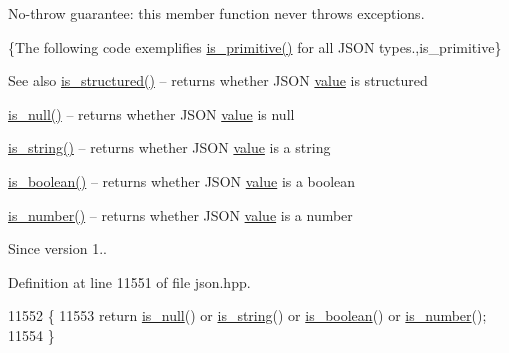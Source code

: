 No-\/throw guarantee\+: this member function never throws exceptions.

\{The following code exemplifies {\ttfamily \hyperlink{classnlohmann_1_1basic__json_a6362b88718eb5c6d4fed6a61eed44b95}{is\+\_\+primitive()}} for all J\+S\+ON types.,is\+\_\+primitive\}

\begin{DoxySeeAlso}{See also}
\hyperlink{classnlohmann_1_1basic__json_a9f68a0af820c3ced7f9d17851ce4c22d}{is\+\_\+structured()} -- returns whether J\+S\+ON \hyperlink{classnlohmann_1_1basic__json_adcf8ca5079f5db993820bf50036bf45d}{value} is structured 

\hyperlink{classnlohmann_1_1basic__json_a8faa039ca82427ed29c486ffd00600c3}{is\+\_\+null()} -- returns whether J\+S\+ON \hyperlink{classnlohmann_1_1basic__json_adcf8ca5079f5db993820bf50036bf45d}{value} is {\ttfamily null} 

\hyperlink{classnlohmann_1_1basic__json_a69b596a4a6683b362095c9a139637396}{is\+\_\+string()} -- returns whether J\+S\+ON \hyperlink{classnlohmann_1_1basic__json_adcf8ca5079f5db993820bf50036bf45d}{value} is a string 

\hyperlink{classnlohmann_1_1basic__json_a943e8cb182d0f2365c76d64b42eaa6fd}{is\+\_\+boolean()} -- returns whether J\+S\+ON \hyperlink{classnlohmann_1_1basic__json_adcf8ca5079f5db993820bf50036bf45d}{value} is a boolean 

\hyperlink{classnlohmann_1_1basic__json_a2b9852390abb4b1ef5fac6984e2fc0f3}{is\+\_\+number()} -- returns whether J\+S\+ON \hyperlink{classnlohmann_1_1basic__json_adcf8ca5079f5db993820bf50036bf45d}{value} is a number
\end{DoxySeeAlso}
\begin{DoxySince}{Since}
version 1.. 
\end{DoxySince}


Definition at line 11551 of file json.\+hpp.


\begin{DoxyCode}
11552     \{
11553         \textcolor{keywordflow}{return} \hyperlink{classnlohmann_1_1basic__json_a8faa039ca82427ed29c486ffd00600c3}{is\_null}() or \hyperlink{classnlohmann_1_1basic__json_a69b596a4a6683b362095c9a139637396}{is\_string}() or \hyperlink{classnlohmann_1_1basic__json_a943e8cb182d0f2365c76d64b42eaa6fd}{is\_boolean}() or 
      \hyperlink{classnlohmann_1_1basic__json_a2b9852390abb4b1ef5fac6984e2fc0f3}{is\_number}();
11554     \}
\end{DoxyCode}
\mbox{\label{classnlohmann_1_1basic__json_a69b596a4a6683b362095c9a139637396}} 
